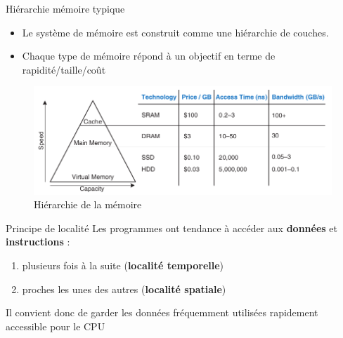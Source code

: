 \documentclass[8pt]{beamer}
\begin{document}
\begin{frame}{Hiérarchie mémoire typique}
    \begin{itemize}
        \item Le système de mémoire est construit comme une hiérarchie de
              couches.
        \item Chaque type de m\'emoire r\'epond \`a un objectif en terme de
              rapidit\'e/taille/co\^ut
    \end{itemize}

    \begin{figure}
        \centering
        \includegraphics[width=.75\textwidth]{figures/memory_speed_HH.png}
        \caption{Hiérarchie de la mémoire \cite{harris2021digital}}
    \end{figure}

    \begin{block}{Principe de localité}
        Les programmes ont tendance à accéder aux \textbf{données} et
        \textbf{instructions} :
        \begin{enumerate}
            \item plusieurs fois \`a la suite (\textbf{localité temporelle})
            \item proches les unes des autres (\textbf{localité spatiale})
        \end{enumerate}
        Il convient donc de garder les données fréquemment utilisées rapidement
        accessible pour le CPU
    \end{block}
\end{frame}
\end{document}

